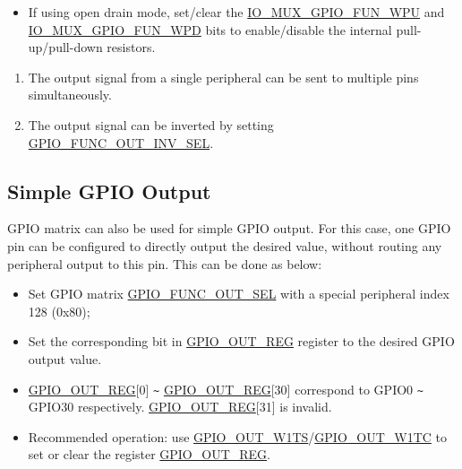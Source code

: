 \documentclass[main\_\_EN.tex]{subfiles}
\begin{document}
\begin{enumerate}
\begin{itemize}
        \item If using open drain mode, set/clear the \hyperref[fielddesc:IOMUXGPIONFUNWPU]{IO\_MUX\_GPIO\_FUN\_WPU} and \hyperref[fielddesc:IOMUXGPIONFUNWPD]{IO\_MUX\_GPIO\_FUN\_WPD} bits to enable/disable the internal pull-up/pull-down resistors.
    \end{itemize}
\end{enumerate}

\begin{tiplisting}
\vspace{-2em}
\begin{enumerate}
\item \label{output-note-1} The output signal from a single peripheral can be sent to multiple pins simultaneously.
\item \label{output-note-2} The output signal can be inverted by setting \hyperref[fielddesc:GPIOFUNCNOUTINVSEL]{GPIO\_FUNC\_OUT\_INV\_SEL}.
\end{enumerate}
\end{tiplisting}

\subsection{Simple GPIO Output}

GPIO matrix can also be used for simple GPIO output. For this case, one GPIO pin can be configured to directly output the desired value, without routing any peripheral output to this pin. This can be done as below:

\begin{itemize}
    \item Set GPIO matrix \hyperref[fielddesc:GPIOFUNCNOUTSEL]{GPIO\_FUNC\_OUT\_SEL} with a special peripheral index 128 (0x80);
    \item Set the corresponding bit in \hyperref[regdesc:GPIOOUTREG]{GPIO\_OUT\_REG} register to the desired GPIO output value.
\end{itemize}

\begin{tiplisting}
\vspace{-2em}
\begin{itemize} 
\item \hyperref[regdesc:GPIOOUTREG]{GPIO\_OUT\_REG}[0] \verb+~+ \hyperref[regdesc:GPIOOUTREG]{GPIO\_OUT\_REG}[30] correspond to GPIO0 \verb+~+ GPIO30 respectively.  \hyperref[regdesc:GPIOOUTREG]{GPIO\_OUT\_REG}[31] is invalid.
\item Recommended operation: use \hyperref[fielddesc:GPIOOUTW1TS]{GPIO\_OUT\_W1TS}/\hyperref[fielddesc:GPIOOUTW1TC]{GPIO\_OUT\_W1TC} to set or clear the register \hyperref[regdesc:GPIOOUTREG]{GPIO\_OUT\_REG}.
\end{itemize}
\end{tiplisting}
\end{document}
